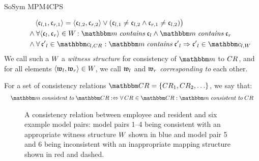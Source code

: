 \begin{copiedFrom}{SoSym MPM4CPS}
\begin{definition}[Consistency]
\begin{align*}
        & \formulaskip\formulaskip\formulaskip
        \tupled{\conditionelement{c}{l,1}, \conditionelement{c}{r,1}} = \tupled{\conditionelement{c}{l,2}, \conditionelement{c}{r,2}} \lor 
        ( \conditionelement{c}{l,1} \neq \conditionelement{c}{l,2} \land \conditionelement{c}{r,1} \neq \conditionelement{c}{l,2}) \bigr) \\
        & \formulaskip\formulaskip
        \land \forall \tupled{\conditionelement{c}{l}, \conditionelement{c}{r}} \in  \consistencyrelation{W}{} : \modelset{m} \containsmath \conditionelement{c}{l} \land \modelset{m} \containsmath \conditionelement{c}{r} \\
        & \formulaskip\formulaskip
        \land \forall \conditionelement{c'}{l} \in \condition{c}{l,\consistencyrelation{CR}{}} : \modelset{m} \containsmath \conditionelement{c'}{l} \Rightarrow \conditionelement{c'}{l} \in \condition{c}{l,\consistencyrelation{W}{}}
    \end{align*}
    We call such a $W_{}$ a \emph{witness structure} for consistency of $\modelset{m}$ to $CR_{}$, and for all elements $\langle \mathfrak{w}_{l}, \mathfrak{w}_{r} \rangle \in W_{}$, we call $\mathfrak{w}_{l}$ and $\mathfrak{w}_{r}$ \emph{corresponding to} each other.
    
    For a set of consistency relations $\consistencyrelationset{CR} = \setted{\consistencyrelation{CR}{1}, \consistencyrelation{CR}{2}, \dots}$, we say that:
    \begin{align*}
        \formulaskip &
        \modelset{m} \mathtext{consistent to} \consistencyrelationset{CR} \equivalentperdefinition %
        \forall \consistencyrelation{CR}{} \in \consistencyrelationset{CR} : \modelset{m} \mathtext{consistent to} \consistencyrelation{CR}{}
    \end{align*}
\end{definition}

\begin{figure}
    \centering
    
    \caption[Examples for fine-grained consistency relations]{A consistency relation between employee and resident and six example model pairs: model pairs 1--4 being consistent with an appropriate witness structure $W_{}$ shown in blue and model pair 5 and 6 being inconsistent with an inappropriate mapping structure shown in red and dashed.}
    \label{fig:compatibility:formal_notion:consistency_example}
\end{figure}


\end{copiedFrom}
